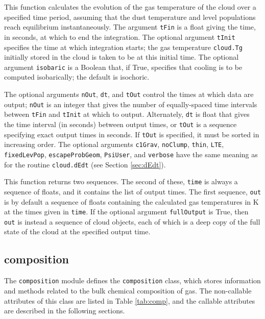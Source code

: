 \documentclass[12pt]{article}
\begin{document}
This function calculates the evolution of the gas temperature of the cloud over a specified time period, assuming that the dust temperature and level populations reach equilibrium instantaneously. The argument \verb=tFin= is a float giving the time, in seconds, at which to end the integration. The optional argument \verb=tInit= specifies the time at which integration starts; the gas temperature \verb=cloud.Tg= initially stored in the cloud is taken to be at this initial time. The optional argument \verb=isobaric= is a Boolean that, if True, specifies that cooling is to be computed isobarically; the default is isochoric.

The optional arguments \verb=nOut=, \verb=dt=, and \verb=tOut= control the times at which data are output; \verb=nOut= is an integer that gives the number of equally-spaced time intervals between \verb=tFin= and \verb=tInit= at which to output. Alternately, \verb=dt= is float that gives the time interval (in seconds) between output times, or \verb=tOut= is a sequence specifying exact output times in seconds. If \verb=tOut= is specified, it must be sorted in increasing order. The optional arguments \verb=c1Grav=, \verb=noClump=, \verb=thin=, \verb=LTE=, \verb=fixedLevPop=, \verb=escapeProbGeom=, \verb=PsiUser=, and \verb=verbose= have the same meaning as for the routine \verb=cloud.dEdt= (see Section \ref{sec:dEdt}). 

This function returns two sequences. The second of these, \verb=time= is always a sequence of floats, and it contains the list of output times. The first sequence, \verb=out= is by default a sequence of floats containing the calculated gas temperatures in K at the times given in \verb=time=. If the optional argument \verb=fullOutput= is True, then \verb=out= is instead a sequence of cloud objects, each of which is a deep copy of the full state of the cloud at the specified output time.

\clearpage

\subsection{composition}
\label{sec:comp}

The \verb=composition= module defines the \verb=composition= class, which stores information and methods related to the bulk chemical composition of gas. The non-callable attributes of this class are listed in Table \ref{tab:comp}, and the callable attributes are described in the following sections.
\end{document}
